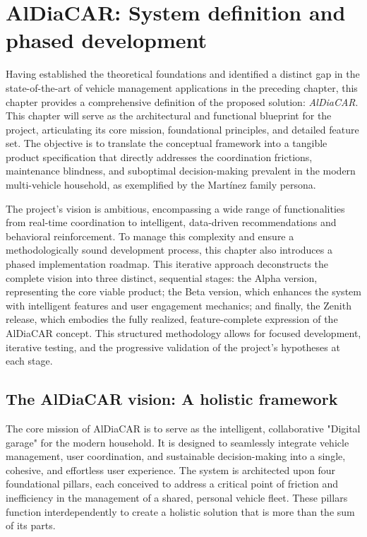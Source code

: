 \chapter{AlDiaCAR: System definition and phased development}

Having established the theoretical foundations and identified a distinct gap in the state-of-the-art of vehicle management applications in the preceding chapter, this chapter provides a comprehensive definition of the proposed solution: \textit{AlDiaCAR}. This chapter will serve as the architectural and functional blueprint for the project, articulating its core mission, foundational principles, and detailed feature set. The objective is to translate the conceptual framework into a tangible product specification that directly addresses the coordination frictions, maintenance blindness, and suboptimal decision-making prevalent in the modern multi-vehicle household, as exemplified by the Martínez family persona.

\textgap

The project's vision is ambitious, encompassing a wide range of functionalities from real-time coordination to intelligent, data-driven recommendations and behavioral reinforcement. To manage this complexity and ensure a methodologically sound development process, this chapter also introduces a phased implementation roadmap. This iterative approach deconstructs the complete vision into three distinct, sequential stages: the Alpha version, representing the core viable product; the Beta version, which enhances the system with intelligent features and user engagement mechanics; and finally, the Zenith release, which embodies the fully realized, feature-complete expression of the AlDiaCAR concept. This structured methodology allows for focused development, iterative testing, and the progressive validation of the project's hypotheses at each stage.

\section{The AlDiaCAR vision: A holistic framework}

The core mission of AlDiaCAR is to serve as the intelligent, collaborative "Digital garage" for the modern household. It is designed to seamlessly integrate vehicle management, user coordination, and sustainable decision-making into a single, cohesive, and effortless user experience. The system is architected upon four foundational pillars, each conceived to address a critical point of friction and inefficiency in the management of a shared, personal vehicle fleet. These pillars function interdependently to create a holistic solution that is more than the sum of its parts.

